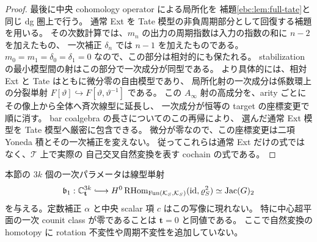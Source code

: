 \begin{proof}
最後に中央 cohomology operator による局所化を
補題\ref{ebc:lem:full-tate}と同じ dg 圏上で行う。
通常 Ext を Tate 模型の非負周期部分として回復する補題
を用いる。
その次数計算では、$m_n$ の出力の周期指数は入力の指数の和に $n-2$ を加えたもの、
一次補正 $\delta_n$ では $n-1$ を加えたものである。
$m_0=m_1=\delta_0=\delta_1=0$ なので、この部分は相対的にも保たれる。
stabilization の最小模型間の射はこの部分で一次成分が同型である。
より具体的には、相対 Ext と Tate はともに微分零の自由模型であり、
局所化射の一次成分は係数環上の分裂単射
$F[\vartheta]\hookrightarrow F[\vartheta,\vartheta^{-1}]$ である。
この $A_\infty$ 射の高成分を、arity ごとにその像上から全体へ斉次線型に延長し、
一次成分が恒等の target の座標変更で順に消す。
bar coalgebra の長さについてのこの再帰により、
選んだ通常 Ext 模型を Tate 模型へ厳密に包含できる。
微分が零なので、この座標変更は二項 Yoneda 積とその一次補正を変えない。
従ってこれらは通常 Ext だけの式ではなく、$\mathcal T$ 上で実際の
自己交叉自然変換を表す cochain の式である。
\end{proof}

\begin{theorem}[持上げ可能な一次パラメータ全体の単射性]
\label{ebc:thm:first-injection}
本節の $3k$ 個の一次パラメータは線型単射
\begin{equation}\label{ebc:eq:first-injection}
 \mathfrak b_1:\C^{3k}_{\mathbf t}\lhook\joinrel\longrightarrow
 H^0\operatorname{RHom}_{\operatorname{Fun}(\mathcal K_S,\mathcal K_S)}
       (\operatorname{id},\varrho_S^2)
       \simeq\operatorname{Jac}(G)_2
\end{equation}
を与える。定数補正 $\alpha$ と中央 scalar 項 $c$ はこの写像に現れない。
特に中心超平面の一次 counit class が零であることは
$\mathbf t=0$ と同値である。
ここで自然変換の homotopy に rotation 不変性や周期不変性を追加していない。
\end{theorem}

